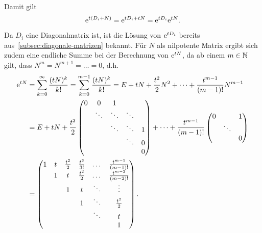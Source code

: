 Damit gilt
\begin{equation*}
    \mathrm{e}^{t (D_i + N)} = \mathrm{e}^{t D_i + t N} = \mathrm{e}^{t D_i} \mathrm{e}^{t N}.
\end{equation*}

Da $D_i$ eine Diagonalmatrix ist, ist die Lösung von $\mathrm{e}^{t D_i}$ bereits aus~\autoref{subsec:diagonale-matrizen} bekannt.
Für $N$ als nilpotente Matrix ergibt sich zudem eine endliche Summe bei der Berechnung von $\mathrm{e}^{t N}$,
da ab einem $m \in \mathbb{N}$ gilt, dass $N^m = N^{m+1} = \dots = 0$, d.h.
\begin{align*}
    \mathrm{e}^ {tN } &= \sum^\infty_{k=0} \frac{(t N)^k}{k!}
        = \sum^{m-1}_{k=0} \frac{(t N)^k}{k!}
        = E + t N + \frac{t^2}{2} N^2 + \dots + \frac{t^{m-1}}{(m-1)!} N^{m-1}\\
    &= E + t N +  \frac{t^2}{2} \begin{pmatrix}
                                0 & 0      & 1      &        & \\
                                  & \ddots & \ddots & \ddots & \\
                                  &        & \ddots & \ddots & 1\\
                                  &        &        & \ddots & 0\\
                                  &        &        &        & 0
                            \end{pmatrix}
        + \dots + \frac{t^{m-1}}{(m-1)!}  \begin{pmatrix}
                                        0 &        & 1\\
                                          & \ddots & \\
                                          &        & 0
                                    \end{pmatrix}\\
    &= \begin{pmatrix}
           1 & t & \frac{t^2}{2} & \frac{t^3}{3!} & \dots  & \frac{t^{m-1}}{(m-1)!}\\
           & 1 & t               & \frac{t^2}{2}  & \dots  & \frac{t^{m-2}}{(m-2)!}\\
           &   & 1               & t              & \ddots  & \vdots\\
           &   &                 & 1              & \ddots & \frac{t^2}{2}\\
           &   &                 &                & \ddots & t\\
           &   &                 &                &        & 1
    \end{pmatrix}.
\end{align*}

